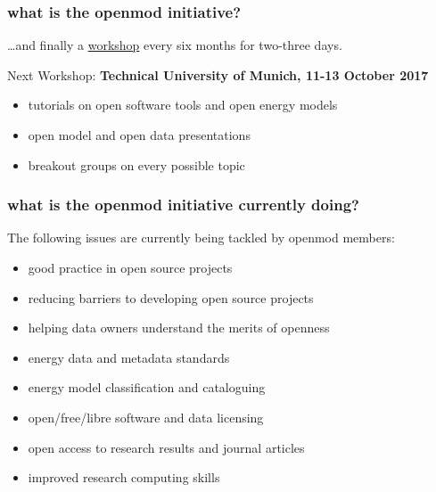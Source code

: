 \documentclass[12pt,aspectratio=169]{beamer}
\let\olditem\item
\renewcommand{\item}{%
\olditem\vspace{5pt}}
\begin{document}
\begin{frame}
  \frametitle{what is the openmod initiative?}

  \dots and finally a \alert{\href{https://wiki.openmod-initiative.org/wiki/Open_Energy_Modelling_Workshop_-_Munich_2017}{workshop}} every six months for two-three days.

  \vspace{.5cm}

  Next Workshop: {\bf Technical University of Munich, 11-13 October 2017}

  \begin{itemize}
  \item  tutorials on open software tools and open energy models
  \item open model and open data presentations
  \item breakout  groups on every possible topic
  \end{itemize}

\end{frame}


\begin{frame}
  \frametitle{what is the openmod initiative currently doing?}

  The following \alert{issues} are currently being tackled by
  openmod members:
  \begin{itemize}
  \item   good practice in open source projects
  \item reducing barriers to developing open source projects
  \item helping data owners understand the merits of openness
  \item energy data and metadata standards
  \item energy model classification and cataloguing
  \item open/free/libre software and data licensing
  \item open access to research results and journal articles
  \item improved research computing skills
  \end{itemize}
\end{frame}
\end{document}
